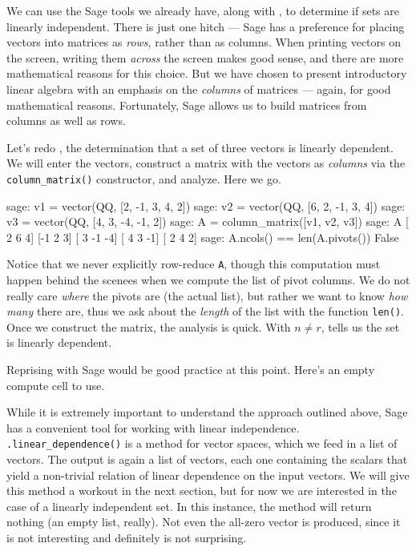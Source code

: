 We can use the Sage tools we already have, along with , to determine if sets are linearly independent.  There is just one hitch --- Sage has a preference for placing vectors into matrices as \emph{rows}, rather than as columns.  When printing vectors on the screen, writing them \emph{across} the screen makes good sense, and there are more mathematical reasons for this choice.  But we have chosen to present introductory linear algebra with an emphasis on the \emph{columns} of matrices --- again, for good mathematical reasons.  Fortunately, Sage allows us to build matrices from columns as well as rows.\par
%
Let's redo , the determination that a set of three vectors is linearly dependent.  We will enter the vectors, construct a matrix with the vectors as \emph{columns} via the \verb!column_matrix()! constructor, and analyze.  Here we go.
%
\begin{sageexample}
sage: v1 = vector(QQ, [2, -1,  3,  4, 2])
sage: v2 = vector(QQ, [6,  2, -1,  3, 4])
sage: v3 = vector(QQ, [4,  3, -4, -1, 2])
sage: A = column_matrix([v1, v2, v3])
sage: A
[ 2  6  4]
[-1  2  3]
[ 3 -1 -4]
[ 4  3 -1]
[ 2  4  2]
sage: A.ncols() == len(A.pivots())
False
\end{sageexample}
%
Notice that we never explicitly row-reduce \verb?A?, though this computation must happen behind the scenees when we compute the list of pivot columns.  We do not really care \emph{where} the pivots are (the actual list), but rather we want to know \emph{how many} there are, thus we ask about the \emph{length} of the list with the function \verb?len()?.  Once we construct the matrix, the analysis is quick.  With $n\neq r$,  tells us the set is linearly dependent.\par
%
Reprising  with Sage would be good practice at this point.  Here's an empty compute cell to use.
%
\begin{sageverbatim}
\end{sageverbatim}
%
While it is extremely important to understand the approach outlined above, Sage has a convenient tool for working with linear independence. \verb?.linear_dependence()?  is a method for vector spaces, which we feed in a list of vectors.  The output is again a list of vectors, each one containing the scalars that yield a non-trivial relation of linear dependence on the input vectors.  We will give this method a workout in the next section, but for now we are interested in the case of a linearly independent set.  In this instance, the method will return nothing (an empty list, really).  Not even the all-zero vector is produced, since it is not interesting and definitely is not surprising.\par
